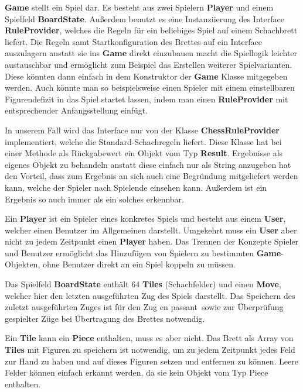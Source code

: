 \documentclass[parskip=full]{scrartcl}
\begin{document}
				\begin{description}
					\item \textbf{Game} stellt ein Spiel dar. Es besteht aus zwei Spielern \textbf{Player} und einem Spielfeld \textbf{BoardState}. Außerdem benutzt es eine Instanziierung des Interface \textbf{RuleProvider}, welches die Regeln für ein beliebiges Spiel auf einem Schachbrett liefert. Die Regeln samt Startkonfiguration des Brettes auf ein Interface auszulagern anstatt sie ins \textbf{Game} direkt einzubauen macht die Spiellogik leichter austauschbar und ermöglicht zum Beispiel das Erstellen weiterer Spielvarianten. Diese könnten dann einfach in dem Konstruktor der \textbf{Game} Klasse mitgegeben werden. Auch könnte man so beispielsweise einen Spieler mit einem einstellbaren Figurendefizit in das Spiel startet lassen, indem man einen \textbf{RuleProvider} mit entsprechender Anfangsstellung einfügt.
					\item In unserem Fall wird das Interface nur von der Klasse \textbf{ChessRuleProvider} implementiert, welche die Standard-Schachregeln liefert. Diese Klasse hat bei einer Methode als Rückgabewert ein Objekt vom Typ \textbf{Result}. Ergebnisse als eigenes Objekt zu behandeln anstatt diese einfach nur als String anzugeben hat den Vorteil, dass zum Ergebnis an sich auch eine Begründung mitgeliefert werden kann, welche der Spieler nach Spielende einsehen kann. Außerdem ist ein Ergebnis so auch immer als ein solches erkennbar.
					\item Ein \textbf{Player} ist ein Spieler eines konkretes Spiels und besteht aus einem \textbf{User}, welcher einen Benutzer im Allgemeinen darstellt. Umgekehrt muss ein \textbf{User} aber nicht zu jedem Zeitpunkt einen \textbf{Player} haben. Das Trennen der Konzepte Spieler und Benutzer ermöglicht das Hinzufügen von Spielern zu bestimmten \textbf{Game}-Objekten, ohne Benutzer direkt an ein Spiel koppeln zu müssen.
					\item Das Spielfeld \textbf{BoardState} enthält 64  \textbf{Tiles} (Schachfelder) und einen \textbf{Move}, welcher hier den letzten ausgeführten Zug des Spiels darstellt. Das Speichern des zuletzt ausgeführten Zuges ist für den Zug \glqq en passant\grqq\ sowie zur Überprüfung gespielter Züge bei Übertragung des Brettes notwendig.
					\item Ein \textbf{Tile} kann ein \textbf{Piece} enthalten, muss es aber nicht. Das Brett als Array von \textbf{Tiles} mit Figuren zu speichern ist notwendig, um zu jedem Zeitpunkt jedes Feld zur Hand zu haben und auf dieses Figuren setzen und entfernen zu können. Leere Felder können einfach erkannt werden, da sie kein Objekt vom Typ Piece enthalten.

\end{description}
\end{document}
